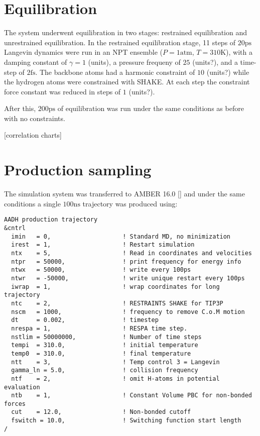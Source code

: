 \section{Equilibration}
The system underwent equilibration in two stages: restrained equilibration and unrestrained equilibration. In the restrained equilibration stage, 11 steps of $20\mathrm{ps}$ Langevin dynamics were run in an NPT ensemble ($P=1\mathrm{atm}$, $T=310\mathrm{K}$), with a damping constant of $\gamma=1$ (units), a pressure frequeny of $25$ (units?), and a time-step of $2\mathrm{fs}$. The backbone atoms had a harmonic constraint of $10$ (units?) while the hydrogen atoms were constrained with SHAKE. At each step the constraint force constant was reduced in steps of $1$ (units?).  

After this, $200\mathrm{ps}$ of equilibration was run under the same conditions as before with no constraints. 

[correlation charts]

\section{Production sampling}

The simulation system was transferred to AMBER 16.0 [] and under the same conditions a single $100\mathrm{ns}$ trajectory was produced using: 

\begin{lstlisting}
AADH production trajectory
&cntrl
  imin   = 0,                    ! Standard MD, no minimization
  irest  = 1,                    ! Restart simulation
  ntx    = 5,                    ! Read in coordinates and velocities
  ntpr   = 50000,                ! print frequency for energy info 
  ntwx   = 50000,                ! write every 100ps
  ntwr   = -50000,               ! write unique restart every 100ps 
  iwrap  = 1,                    ! wrap coordinates for long trajectory
  ntc    = 2,                    ! RESTRAINTS SHAKE for TIP3P
  nscm   = 1000,                 ! frequency to remove C.o.M motion
  dt     = 0.002,                ! timestep
  nrespa = 1,                    ! RESPA time step. 
  nstlim = 50000000,             ! Number of time steps
  tempi  = 310.0,                ! initial temperature
  temp0  = 310.0,                ! final temperature
  ntt    = 3,                    ! Temp control 3 = Langevin
  gamma_ln = 5.0,                ! collision frequency
  ntf    = 2,                    ! omit H-atoms in potential evaluation
  ntb    = 1,                    ! Constant Volume PBC for non-bonded forces
  cut    = 12.0,                 ! Non-bonded cutoff
  fswitch = 10.0,                ! Switching function start length
/
\end{lstlisting}

